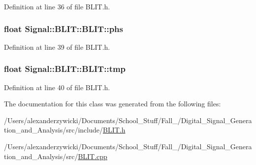 Definition at line 36 of file B\+L\+I\+T.\+h.

\hypertarget{classSignal_1_1BLIT_1_1BLIT_afd06bf26696642f7eb400fb984e524f3}{
\subsubsection[{phs}]{\setlength{\rightskip}{0pt plus 5cm}float Signal\+::\+B\+L\+I\+T\+::\+B\+L\+I\+T\+::phs\hspace{0.3cm}{\ttfamily [protected]}}}\label{classSignal_1_1BLIT_1_1BLIT_afd06bf26696642f7eb400fb984e524f3}


Definition at line 39 of file B\+L\+I\+T.\+h.

\hypertarget{classSignal_1_1BLIT_1_1BLIT_aa543d207e6dd260762652221c598bae9}{
\subsubsection[{tmp}]{\setlength{\rightskip}{0pt plus 5cm}float Signal\+::\+B\+L\+I\+T\+::\+B\+L\+I\+T\+::tmp\hspace{0.3cm}{\ttfamily [protected]}}}\label{classSignal_1_1BLIT_1_1BLIT_aa543d207e6dd260762652221c598bae9}


Definition at line 40 of file B\+L\+I\+T.\+h.



The documentation for this class was generated from the following files\+:\begin{DoxyCompactItemize}
\item 
/\+Users/alexanderzywicki/\+Documents/\+School\+\_\+\+Stuff/\+Fall\+\_/\+Digital\+\_\+\+Signal\+\_\+\+Generation\+\_\+and\+\_\+\+Analysis/src/include/\hyperlink{BLIT_8h}{B\+L\+I\+T.\+h}\item 
/\+Users/alexanderzywicki/\+Documents/\+School\+\_\+\+Stuff/\+Fall\+\_/\+Digital\+\_\+\+Signal\+\_\+\+Generation\+\_\+and\+\_\+\+Analysis/src/\hyperlink{BLIT_8cpp}{B\+L\+I\+T.\+cpp}\end{DoxyCompactItemize}
